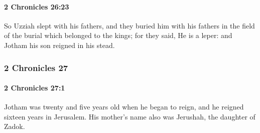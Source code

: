 		\paragraph{2 Chronicles 26:23} %
			\label{2CHRONICLES-26-23}

			So Uzziah slept with his fathers, and they buried him with his fathers in the field of the burial which belonged to the kings; for they said, He is a leper: and Jotham his son reigned in his stead.

	\subsubsection{2 Chronicles 27} %
		\label{2CHRONICLES-27}

		\paragraph{2 Chronicles 27:1} %
			\label{2CHRONICLES-27-1}

			Jotham was twenty and five years old when he began to reign, and he reigned sixteen years in Jerusalem. His mother's name also was Jerushah, the daughter of Zadok.

